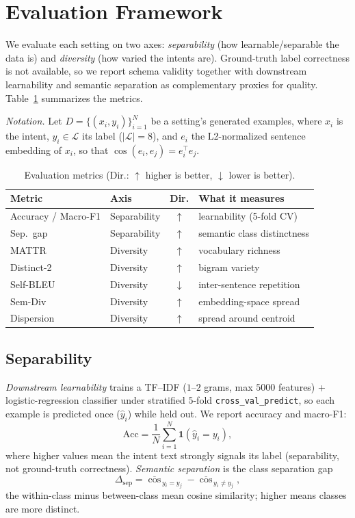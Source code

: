\documentclass[conference]{IEEEtran}
\begin{document}
\section{Evaluation Framework}
\label{sec:eval}

We evaluate each setting on two axes: \emph{separability} (how learnable/separable the data is) and \emph{diversity} (how varied the intents are). Ground-truth label correctness is not available, so we report schema validity together with downstream learnability and semantic separation as complementary proxies for quality. Table~\ref{tab:metrics} summarizes the metrics.

\emph{Notation.} Let $D=\{(x_i,y_i)\}_{i=1}^{N}$ be a setting's generated examples, where $x_i$ is the intent, $y_i\in\mathcal{L}$ its label ($|\mathcal{L}|=8$), and $e_i$ the L2-normalized sentence embedding of $x_i$, so that $\cos(e_i,e_j)=e_i^{\top}e_j$.

\begin{table}[t]
\centering
\small
\caption{Evaluation metrics (Dir.: $\uparrow$ higher is better, $\downarrow$ lower is better).}
\label{tab:metrics}
\begin{tabular}{llcl}
\toprule
\textbf{Metric} & \textbf{Axis} & \textbf{Dir.} & \textbf{What it measures} \\
\midrule
Accuracy / Macro-F1 & Separability & $\uparrow$ & learnability (5-fold CV) \\
Sep.\ gap & Separability & $\uparrow$ & semantic class distinctness \\
MATTR & Diversity & $\uparrow$ & vocabulary richness \\
Distinct-2 & Diversity & $\uparrow$ & bigram variety \\
Self-BLEU & Diversity & $\downarrow$ & inter-sentence repetition \\
Sem-Div & Diversity & $\uparrow$ & embedding-space spread \\
Dispersion & Diversity & $\uparrow$ & spread around centroid \\
\bottomrule
\end{tabular}
\end{table}

\subsection{Separability}
\emph{Downstream learnability} trains a TF--IDF ($1$--$2$ grams, max $5000$ features) + logistic-regression classifier under stratified $5$-fold \texttt{cross\_val\_predict}, so each example is predicted once ($\hat{y}_i$) while held out. We report accuracy and macro-F1:
\begin{equation}
\mathrm{Acc}=\frac{1}{N}\sum_{i=1}^{N}\mathbf{1}(\hat{y}_i=y_i),
\end{equation}
where higher values mean the intent text strongly signals its label (separability, not ground-truth correctness). \emph{Semantic separation} is the class separation gap
\begin{equation}
\Delta_{\mathrm{sep}}=\overline{\cos}_{\,y_i=y_j}-\overline{\cos}_{\,y_i\neq y_j},
\end{equation}
the within-class minus between-class mean cosine similarity; higher means classes are more distinct.
\end{document}
